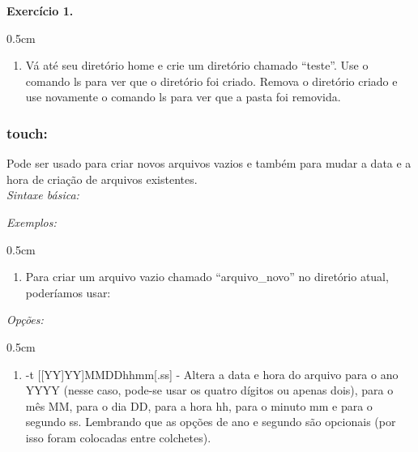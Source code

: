 \begin{refsection}
\begin{blackBlock}{\textbf{Exercício 1.}}\label{tut1:ex:1.\arabic{ex}}

\begin {myindentpar}{0.5cm}
\begin{enumerate}[\itshape i.]
 \item{Vá até seu diretório home e crie um diretório chamado ``teste''. Use o comando ls para ver que o diretório foi criado. Remova o diretório criado e use novamente o comando ls para ver que a pasta foi removida.}
\end{enumerate}
\end{myindentpar}

\end{blackBlock}

\subsubsection{touch:}\label{tut1:text_mode:commands:touch}

 Pode ser usado para criar novos arquivos vazios e também para mudar a data e a hora de criação de arquivos existentes.
\\
\textit{Sintaxe básica:}


\textit{Exemplos:}
 \begin {myindentpar}{0.5cm}
 \begin{enumerate}[\itshape i.]

 \item{Para criar um arquivo vazio chamado ``arquivo\_novo'' no diretório atual, poderíamos usar:}

 
 \end{enumerate}
 \end{myindentpar}

\textit{Opções:}
 \begin {myindentpar}{0.5cm}
 \begin{enumerate}[\itshape i.]

 \item{-t [[YY]YY]MMDDhhmm[.ss] - } Altera a data e hora do arquivo para o ano YYYY (nesse caso, pode-se usar os quatro dígitos ou apenas dois), para o mês MM, para o dia DD, para a hora hh, para o minuto mm e para o segundo ss. Lembrando que as opções de ano e segundo são opcionais (por isso foram colocadas entre colchetes).


\end{enumerate}
\end{myindentpar}
\end{refsection}

